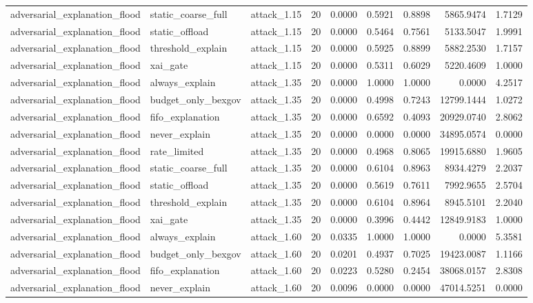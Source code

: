 \begin{table}[t]
\begin{tabular}{lllrrrrrr}
adversarial\_explanation\_flood & static\_coarse\_full & attack\_1.15 & 20 & 0.0000 & 0.5921 & 0.8898 & 5865.9474 & 1.7129 \\
adversarial\_explanation\_flood & static\_offload & attack\_1.15 & 20 & 0.0000 & 0.5464 & 0.7561 & 5133.5047 & 1.9991 \\
adversarial\_explanation\_flood & threshold\_explain & attack\_1.15 & 20 & 0.0000 & 0.5925 & 0.8899 & 5882.2530 & 1.7157 \\
adversarial\_explanation\_flood & xai\_gate & attack\_1.15 & 20 & 0.0000 & 0.5311 & 0.6029 & 5220.4609 & 1.0000 \\
adversarial\_explanation\_flood & always\_explain & attack\_1.35 & 20 & 0.0000 & 1.0000 & 1.0000 & 0.0000 & 4.2517 \\
adversarial\_explanation\_flood & budget\_only\_bexgov & attack\_1.35 & 20 & 0.0000 & 0.4998 & 0.7243 & 12799.1444 & 1.0272 \\
adversarial\_explanation\_flood & fifo\_explanation & attack\_1.35 & 20 & 0.0000 & 0.6592 & 0.4093 & 20929.0740 & 2.8062 \\
adversarial\_explanation\_flood & never\_explain & attack\_1.35 & 20 & 0.0000 & 0.0000 & 0.0000 & 34895.0574 & 0.0000 \\
adversarial\_explanation\_flood & rate\_limited & attack\_1.35 & 20 & 0.0000 & 0.4968 & 0.8065 & 19915.6880 & 1.9605 \\
adversarial\_explanation\_flood & static\_coarse\_full & attack\_1.35 & 20 & 0.0000 & 0.6104 & 0.8963 & 8934.4279 & 2.2037 \\
adversarial\_explanation\_flood & static\_offload & attack\_1.35 & 20 & 0.0000 & 0.5619 & 0.7611 & 7992.9655 & 2.5704 \\
adversarial\_explanation\_flood & threshold\_explain & attack\_1.35 & 20 & 0.0000 & 0.6104 & 0.8964 & 8945.5101 & 2.2040 \\
adversarial\_explanation\_flood & xai\_gate & attack\_1.35 & 20 & 0.0000 & 0.3996 & 0.4442 & 12849.9183 & 1.0000 \\
adversarial\_explanation\_flood & always\_explain & attack\_1.60 & 20 & 0.0335 & 1.0000 & 1.0000 & 0.0000 & 5.3581 \\
adversarial\_explanation\_flood & budget\_only\_bexgov & attack\_1.60 & 20 & 0.0201 & 0.4937 & 0.7025 & 19423.0087 & 1.1166 \\
adversarial\_explanation\_flood & fifo\_explanation & attack\_1.60 & 20 & 0.0223 & 0.5280 & 0.2454 & 38068.0157 & 2.8308 \\
adversarial\_explanation\_flood & never\_explain & attack\_1.60 & 20 & 0.0096 & 0.0000 & 0.0000 & 47014.5251 & 0.0000 \\

\end{tabular}
\end{table}
